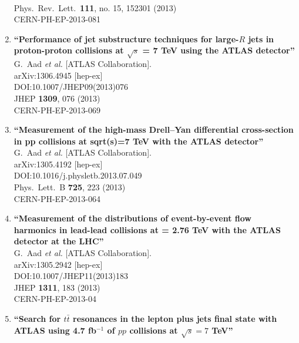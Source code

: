 \documentclass{article}
\begin{document}
\begin{enumerate}
  \\{}Phys.\ Rev.\ Lett.\  {\bf 111}, no. 15, 152301 (2013)
  \\{}CERN-PH-EP-2013-081
\item%
{\bf ``Performance of jet substructure techniques for large-$R$ jets in proton-proton collisions at $\sqrt{s}$ = 7 TeV using the ATLAS detector''}
  \\{}G.~Aad {\it et al.} [ATLAS Collaboration].
  \\{}arXiv:1306.4945 [hep-ex]
  \\{}DOI:10.1007/JHEP09(2013)076
  \\{}JHEP {\bf 1309}, 076 (2013)
  \\{}CERN-PH-EP-2013-069
\item%
{\bf ``Measurement of the high-mass Drell--Yan differential cross-section in pp collisions at sqrt(s)=7 TeV with the ATLAS detector''}
  \\{}G.~Aad {\it et al.} [ATLAS Collaboration].
  \\{}arXiv:1305.4192 [hep-ex]
  \\{}DOI:10.1016/j.physletb.2013.07.049
  \\{}Phys.\ Lett.\ B {\bf 725}, 223 (2013)
  \\{}CERN-PH-EP-2013-064
\item%
{\bf ``Measurement of the distributions of event-by-event flow harmonics in lead-lead collisions at = 2.76 TeV with the ATLAS detector at the LHC''}
  \\{}G.~Aad {\it et al.} [ATLAS Collaboration].
  \\{}arXiv:1305.2942 [hep-ex]
  \\{}DOI:10.1007/JHEP11(2013)183
  \\{}JHEP {\bf 1311}, 183 (2013)
  \\{}CERN-PH-EP-2013-04
\item%
{\bf ``Search for $t\bar t$ resonances in the lepton plus jets final state with ATLAS using 4.7 fb$^{-1}$ of $pp$ collisions at $\sqrt{s} = 7$ TeV''}

\end{enumerate}
\end{document}
